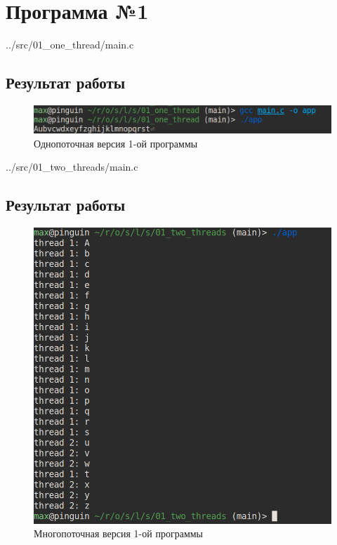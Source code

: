 \section*{Программа №1}
\begin{lstinputlisting}[label=third,caption=Однопоточная версия, language=c, firstline=1, lastline=29]{../src/01_one_thread/main.c}
\end{lstinputlisting}

\subsection*{Результат работы}
\begin{figure}[H]
	\centering
	\includegraphics[scale=0.5]{img/res_01_one.png}
	\caption{Однопоточная версия 1-ой программы}
	\label{fig:1}
\end{figure}

\begin{lstinputlisting}[label=third,caption=Многопоточная версия, language=c, firstline=1, lastline=32]{../src/01_two_threads/main.c}
\end{lstinputlisting}

\subsection*{Результат работы}
\begin{figure}[H]
	\centering
	\includegraphics[scale=0.35]{img/res_01_two.png}
	\caption{Многопоточная версия 1-ой программы}
	\label{fig:2}
\end{figure}

